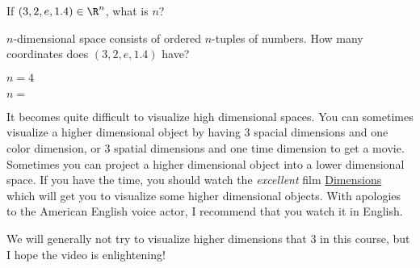 
\begin{question}
	If $(3,2,e,1.4) \in \R^n$, what is $n$?
	\begin{solution}
		\begin{hint}
		$n$-dimensional space consists of ordered $n$-tuples of numbers.  How many coordinates does $(3,2,e,1.4)$ have?
		\end{hint}
		\begin{hint}
			$n=4$
		\end{hint}
	$n = $
	\end{solution}
\end{question}

It becomes quite difficult to visualize high dimensional spaces.  
You can sometimes visualize a higher dimensional object by having $3$ spacial dimensions and one color dimension, or $3$ spatial dimensions and one time 
dimension to get a movie.  Sometimes you can project a higher dimensional object into a lower dimensional space.  If you have the time, you should watch the 
\textit{excellent} film \href{http://www.dimensions-math.org/}{Dimensions}  which will get you to visualize some higher dimensional objects.  
With apologies to the American English voice actor, I recommend that you watch it in English.

We will generally not try to visualize higher dimensions that $3$ in this course, but I hope the video is enlightening!




